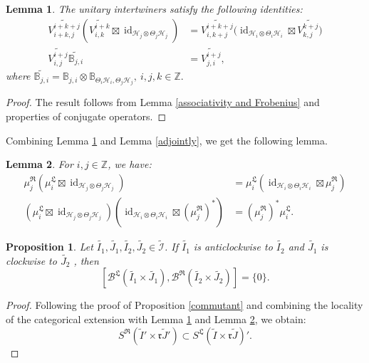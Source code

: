 \documentclass{article}
\newtheorem{proposition}{Proposition}
\newtheorem{lemma}{Lemma}
\newcommand{\hilb}{\mathcal{H}}
\newcommand{\B}{\mathcal{B}}
\newcommand{\Z}{\mathbb{Z}}
\begin{document}
\begin{lemma}\label{assoFroLR1}
    The unitary intertwiners satisfy the following identities:
    \begin{align*}
        \widetilde{V^{i+k+j}_{i+k,j}}(\widetilde{V^{i+k}_{i,k}}\boxtimes \operatorname{id}_{\hilb_j\otimes\Theta_j\hilb_j}) &=   \widetilde{V^{i+k+j}_{i, k+j}}(\operatorname{id}_{\hilb_i\otimes\Theta_i\hilb_i}\boxtimes \widetilde{V^{k+j}_{k,j})} \\
         \widetilde{V^{i+j}_{i,j}} \widetilde{\mathbb{B}_{j,i}} &= \widetilde{V^{i+j}_{j,i}},
    \end{align*}
  where $ \widetilde{\mathbb{B}_{j,i}} = \mathbb{B}_{j,i} \otimes  \mathbb{B}_{\Theta_i\hilb_i, \Theta_j\hilb_j }, \ i, j , k \in\Z.$

\end{lemma}
\begin{proof}
    The result follows from Lemma \ref{associativity and Frobenius} and properties of conjugate operators. 
\end{proof}
Combining  Lemma \ref{assoFroLR1} and Lemma \ref{adjointly}, we get the following lemma. 
\begin{lemma}\label{assoFroLR2}
For $i, j \in \Z$, we have: 
\begin{align*}
    \mu_j^{\mathfrak{R}}(\mu_i^{\mathfrak{L}}\boxtimes \operatorname{id}_{{\hilb_j\otimes \Theta_j\hilb_j}}) &= \mu_i^{\mathfrak{L}}(\operatorname{id}_{{\hilb_i\otimes \Theta_i\hilb_i}}\boxtimes\mu_j^{\mathfrak{R}}) \\
    (\mu_i^{\mathfrak{L}}\boxtimes \operatorname{id}_{\hilb_j\otimes\Theta_j\hilb_j})(\operatorname{id}_{\hilb_i\otimes\Theta_i\hilb_i}\boxtimes (\mu_j^{\mathfrak{R}})^*) &= (\mu_j^{\mathfrak{R}})^* \mu_i^{\mathfrak{L}}.
\end{align*}
    
\end{lemma}

\begin{proposition}\label{locality1}
    Let $\widetilde{I_1}, \widetilde{J_1}, \widetilde{I_2}, \widetilde{J_2}\in \widetilde{\mathcal{I}}$. If $\widetilde{I_1}$ is anticlockwise to  $\widetilde{I_2}$ and $\widetilde{J_1} $ is clockwise to $ \widetilde{J_2}$ , then  
    \[
   [ \B^{\mathfrak{L}}(\widetilde{I_1}\times\widetilde{J_1}), \B^{\mathfrak{R}}(\widetilde{I_2}\times\widetilde{J_2})    ] =\{0\} .
    \]
    
\end{proposition}
\begin{proof}
Following the proof of Proposition \ref{commutant} and  combining the locality of the categorical extension with  Lemma \ref{assoFroLR1} and Lemma \ref{assoFroLR2}, 
we obtain: 
\[
S^{\mathfrak{R}}(\widetilde{I}'\times \mathfrak{r}\widetilde{J}') \subset S^{\mathfrak{L}}(\widetilde{I}\times \mathfrak{r}\widetilde{J})'.
\]
    
\end{proof}
\end{document}
